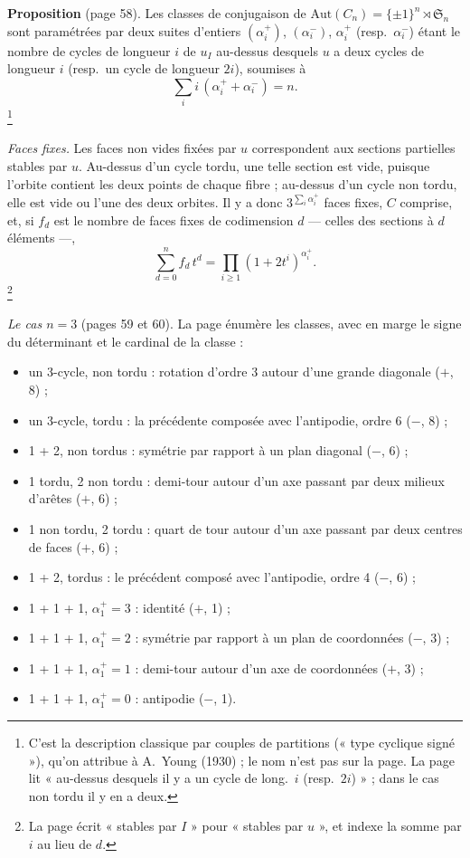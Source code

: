 \documentclass[11pt,a4paper]{article}
\begin{document}
\textbf{Proposition} (page 58). Les classes de conjugaison de $\mathrm{Aut}(C_n)
= \{\pm 1\}^n \rtimes \mathfrak{S}_n$ sont paramétrées par deux suites
d'entiers $(\alpha_i^+)$, $(\alpha_i^-)$, $\alpha_i^+$ (resp.\
$\alpha_i^-$) étant le nombre de cycles de longueur $i$ de $u_I$ au-dessus
desquels $u$ a deux cycles de longueur $i$ (resp.\ un cycle de longueur
$2i$), soumises à
\[
  \sum_i i\,(\alpha_i^+ + \alpha_i^-) = n .
\]
\footnote{C'est la description classique par couples de partitions (« type
cyclique signé »), qu'on attribue à A.~Young (1930) ; le nom n'est pas sur la
page. La page lit « au-dessus desquels il y a un cycle de long.\ $i$ (resp.\
$2i$) » ; dans le cas non tordu il y en a deux.}

\emph{Faces fixes.} Les faces non vides fixées par $u$ correspondent aux
sections partielles stables par $u$. Au-dessus d'un cycle tordu, une telle
section est vide, puisque l'orbite contient les deux points de chaque fibre ;
au-dessus d'un cycle non tordu, elle est vide ou l'une des deux orbites. Il y
a donc $3^{\sum_i \alpha_i^+}$ faces fixes, $C$ comprise, et, si $f_d$ est le
nombre de faces fixes de codimension $d$ --- celles des sections à $d$
éléments ---,
\[
  \sum_{d=0}^n f_d\, t^d = \prod_{i \geqslant 1} (1 + 2t^i)^{\alpha_i^+} .
\]
\footnote{La page écrit « stables par $I$ » pour « stables par $u$ », et
indexe la somme par $i$ au lieu de $d$.}

\emph{Le cas $n = 3$} (pages 59 et 60). La page énumère les classes, avec en
marge le signe du déterminant et le cardinal de la classe :

\begin{itemize}
  \item un 3-cycle, non tordu : rotation d'ordre 3 autour d'une grande diagonale ($+$, 8) ;
  \item un 3-cycle, tordu : la précédente composée avec l'antipodie, ordre 6 ($-$, 8) ;
  \item 1 + 2, non tordus : symétrie par rapport à un plan diagonal ($-$, 6) ;
  \item 1 tordu, 2 non tordu : demi-tour autour d'un axe passant par deux milieux d'arêtes ($+$, 6) ;
  \item 1 non tordu, 2 tordu : quart de tour autour d'un axe passant par deux centres de faces ($+$, 6) ;
  \item 1 + 2, tordus : le précédent composé avec l'antipodie, ordre 4 ($-$, 6) ;
  \item 1 + 1 + 1, $\alpha_1^+ = 3$ : identité ($+$, 1) ;
  \item 1 + 1 + 1, $\alpha_1^+ = 2$ : symétrie par rapport à un plan de coordonnées ($-$, 3) ;
  \item 1 + 1 + 1, $\alpha_1^+ = 1$ : demi-tour autour d'un axe de coordonnées ($+$, 3) ;
  \item 1 + 1 + 1, $\alpha_1^+ = 0$ : antipodie ($-$, 1).
\end{itemize}
\end{document}
